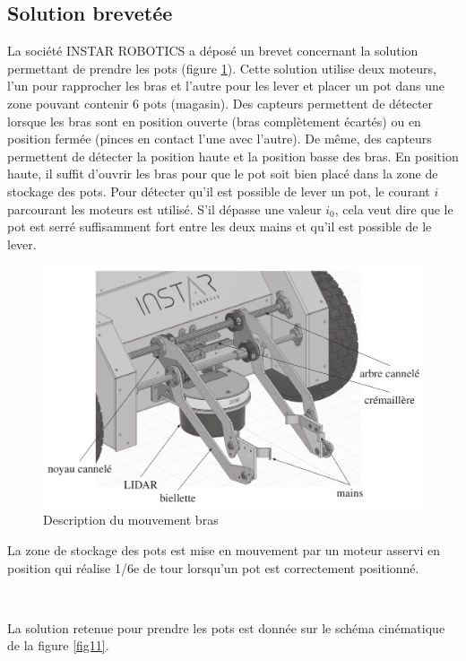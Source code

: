 \subsection{Solution brevetée}

La société INSTAR ROBOTICS a déposé un brevet concernant la solution permettant de prendre les pots (figure \ref{fig10}). Cette solution utilise deux moteurs, l'un pour rapprocher les bras et l'autre pour les lever et placer un pot dans une zone pouvant contenir 6 pots (magasin). Des capteurs permettent de détecter lorsque les bras sont en position ouverte (bras complètement écartés) ou en position fermée (pinces en contact l'une avec l'autre). De même, des capteurs permettent de détecter la position haute et la position basse des bras. En position haute, il suffit d'ouvrir les bras pour que le pot soit bien placé dans la zone de stockage des pots. Pour détecter qu'il est possible de lever un pot, le courant $i$ parcourant les moteurs est utilisé. S'il dépasse une valeur $i_0$, cela veut dire que le pot est serré suffisamment fort entre les deux mains et qu'il est possible de le lever.

\newpage

\begin{figure}[ht!]
\begin{center}
 \includegraphics[width=0.65\linewidth]{img/fig10}
\end{center}
\caption{Description du mouvement bras}
\label{fig10}
\end{figure}

La zone de stockage des pots est mise en mouvement par un moteur asservi en position qui réalise 1/6e de tour lorsqu'un pot est correctement positionné.


~\

La solution retenue pour prendre les pots est donnée sur le schéma cinématique de la figure \ref{fig11}.

